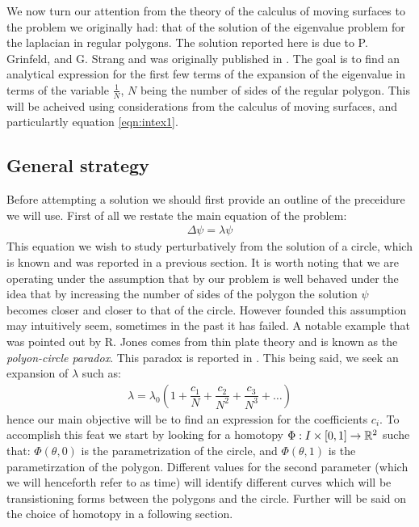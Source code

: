\documentclass[../main.tex]{subfiles}
\begin{document}
		We now turn our attention from the theory of the calculus of moving surfaces to the problem we originally had: that of the solution of the eigenvalue problem for the laplacian in regular polygons. The solution reported here is due to P. Grinfeld, and G. Strang and was originally published in \cite{grinfeld2012laplace}. The goal is to find an analytical expression for the first few terms of the expansion of the eigenvalue in terms of the variable $ \frac{1}{N} $, $ N $ being the number of sides of the regular polygon. This will be acheived using considerations from the calculus of moving surfaces, and particulartly equation \ref{eqn:intex1}.
		\subsection{General strategy}
		Before attempting a solution we should first provide an outline of the preceidure we will use. First of all we restate the main equation of the problem:
		\begin{gather}
			\label{eqn:lapleig}
			\Delta\psi=\lambda\psi
		\end{gather}
		This equation we wish to study perturbatively from the solution of a circle, which is known and was reported in a previous section. It is worth noting that we are operating under the assumption that by our problem is well behaved under the idea that by increasing the number of sides of the polygon the solution $ \psi $ becomes closer and closer to that of the circle. However founded this assumption may intuitively seem, sometimes in the past it has failed. A notable example that was pointed out by R. Jones \cite{Jones2017} comes from thin plate theory and is known as the \emph{polyon-circle paradox}. This paradox is reported in \cite{murray1973polygon}. This being said, we seek an expansion of $ \lambda $ such as:
		\begin{gather}
			\lambda = \lambda_{0}\left(1+\dfrac{c_{1}}{N}+\dfrac{c_{2}}{N^{2}}+\dfrac{c_{3}}{N^{3}}+\dots\right)
		\end{gather}
		hence our main objective will be to find an expression for the coefficients $ c_{i} $. To accomplish this feat we start by looking for a homotopy $ \Phi:I\times\left[0,1\right]\to\mathbb{R}^{2} $ suche that: $ \Phi\left(\theta,0\right) $ is the parametrization of the circle, and $ \Phi\left(\theta,1\right) $ is the parametirzation of the polygon. Different values for the second parameter (which we will henceforth refer to as time) will identify different curves which will be transistioning forms between the polygons and the circle. Further will be said on the choice of homotopy in a following section.
		
\end{document}
